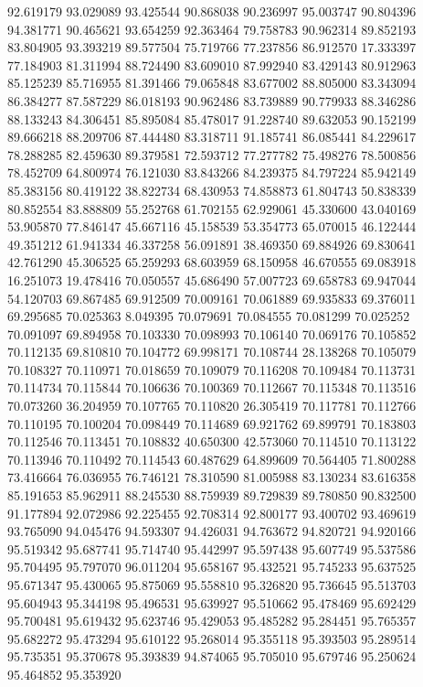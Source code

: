 92.619179
93.029089
93.425544
90.868038
90.236997
95.003747
90.804396
94.381771
90.465621
93.654259
92.363464
79.758783
90.962314
89.852193
83.804905
93.393219
89.577504
75.719766
77.237856
86.912570
17.333397
77.184903
81.311994
88.724490
83.609010
87.992940
83.429143
80.912963
85.125239
85.716955
81.391466
79.065848
83.677002
88.805000
83.343094
86.384277
87.587229
86.018193
90.962486
83.739889
90.779933
88.346286
88.133243
84.306451
85.895084
85.478017
91.228740
89.632053
90.152199
89.666218
88.209706
87.444480
83.318711
91.185741
86.085441
84.229617
78.288285
82.459630
89.379581
72.593712
77.277782
75.498276
78.500856
78.452709
64.800974
76.121030
83.843266
84.239375
84.797224
85.942149
85.383156
80.419122
38.822734
68.430953
74.858873
61.804743
50.838339
80.852554
83.888809
55.252768
61.702155
62.929061
45.330600
43.040169
53.905870
77.846147
45.667116
45.158539
53.354773
65.070015
46.122444
49.351212
61.941334
46.337258
56.091891
38.469350
69.884926
69.830641
42.761290
45.306525
65.259293
68.603959
68.150958
46.670555
69.083918
16.251073
19.478416
70.050557
45.686490
57.007723
69.658783
69.947044
54.120703
69.867485
69.912509
70.009161
70.061889
69.935833
69.376011
69.295685
70.025363
8.049395
70.079691
70.084555
70.081299
70.025252
70.091097
69.894958
70.103330
70.098993
70.106140
70.069176
70.105852
70.112135
69.810810
70.104772
69.998171
70.108744
28.138268
70.105079
70.108327
70.110971
70.018659
70.109079
70.116208
70.109484
70.113731
70.114734
70.115844
70.106636
70.100369
70.112667
70.115348
70.113516
70.073260
36.204959
70.107765
70.110820
26.305419
70.117781
70.112766
70.110195
70.100204
70.098449
70.114689
69.921762
69.899791
70.183803
70.112546
70.113451
70.108832
40.650300
42.573060
70.114510
70.113122
70.113946
70.110492
70.114543
60.487629
64.899609
70.564405
71.800288
73.416664
76.036955
76.746121
78.310590
81.005988
83.130234
83.616358
85.191653
85.962911
88.245530
88.759939
89.729839
89.780850
90.832500
91.177894
92.072986
92.225455
92.708314
92.800177
93.400702
93.469619
93.765090
94.045476
94.593307
94.426031
94.763672
94.820721
94.920166
95.519342
95.687741
95.714740
95.442997
95.597438
95.607749
95.537586
95.704495
95.797070
96.011204
95.658167
95.432521
95.745233
95.637525
95.671347
95.430065
95.875069
95.558810
95.326820
95.736645
95.513703
95.604943
95.344198
95.496531
95.639927
95.510662
95.478469
95.692429
95.700481
95.619432
95.623746
95.429053
95.485282
95.284451
95.765357
95.682272
95.473294
95.610122
95.268014
95.355118
95.393503
95.289514
95.735351
95.370678
95.393839
94.874065
95.705010
95.679746
95.250624
95.464852
95.353920
